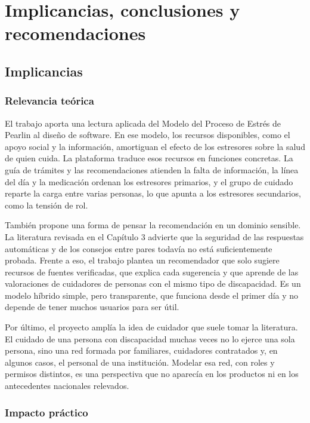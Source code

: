 
\chapter{Implicancias, conclusiones y recomendaciones}\label{cap:conclusiones}

\section{Implicancias}

\subsection{Relevancia teórica}

El trabajo aporta una lectura aplicada del Modelo del Proceso de Estrés de Pearlin al diseño de software. En ese modelo, los recursos disponibles, como el apoyo social y la información, amortiguan el efecto de los estresores sobre la salud de quien cuida. La plataforma traduce esos recursos en funciones concretas. La guía de trámites y las recomendaciones atienden la falta de información, la línea del día y la medicación ordenan los estresores primarios, y el grupo de cuidado reparte la carga entre varias personas, lo que apunta a los estresores secundarios, como la tensión de rol.

También propone una forma de pensar la recomendación en un dominio sensible. La literatura revisada en el Capítulo 3 advierte que la seguridad de las respuestas automáticas y de los consejos entre pares todavía no está suficientemente probada. Frente a eso, el trabajo plantea un recomendador que solo sugiere recursos de fuentes verificadas, que explica cada sugerencia y que aprende de las valoraciones de cuidadores de personas con el mismo tipo de discapacidad. Es un modelo híbrido simple, pero transparente, que funciona desde el primer día y no depende de tener muchos usuarios para ser útil.

Por último, el proyecto amplía la idea de cuidador que suele tomar la literatura. El cuidado de una persona con discapacidad muchas veces no lo ejerce una sola persona, sino una red formada por familiares, cuidadores contratados y, en algunos casos, el personal de una institución. Modelar esa red, con roles y permisos distintos, es una perspectiva que no aparecía en los productos ni en los antecedentes nacionales relevados.

\subsection{Impacto práctico}

